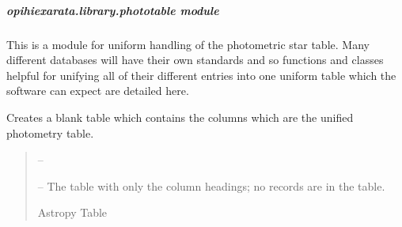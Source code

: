 \documentclass[letterpaper,11pt,english]{sphinxmanual}
\begin{document}
\sphinxstepscope


\subparagraph{opihiexarata.library.phototable module}
\label{\detokenize{code/opihiexarata.library.phototable:module-opihiexarata.library.phototable}}\label{\detokenize{code/opihiexarata.library.phototable:opihiexarata-library-phototable-module}}\label{\detokenize{code/opihiexarata.library.phototable::doc}}
\sphinxAtStartPar
This is a module for uniform handling of the photometric star table.
Many different databases will have their own standards and so functions and
classes helpful for unifying all of their different entries into one uniform
table which the software can expect are detailed here.

\begin{savenotes}\begin{fulllineitems}
\label{\detokenize{code/opihiexarata.library.phototable:opihiexarata.library.phototable.blank_photometry_table}}
\pysigstartsignatures
{}
\pysigstopsignatures
\sphinxAtStartPar
Creates a blank table which contains the columns which are the unified
photometry table.
\begin{quote}\begin{description}
\sphinxAtStartPar
{} – 

\sphinxAtStartPar
{} – The table with only the column headings; no records are in the table.

\sphinxAtStartPar
Astropy Table

\end{description}\end{quote}

\end{fulllineitems}\end{savenotes}

\end{document}
